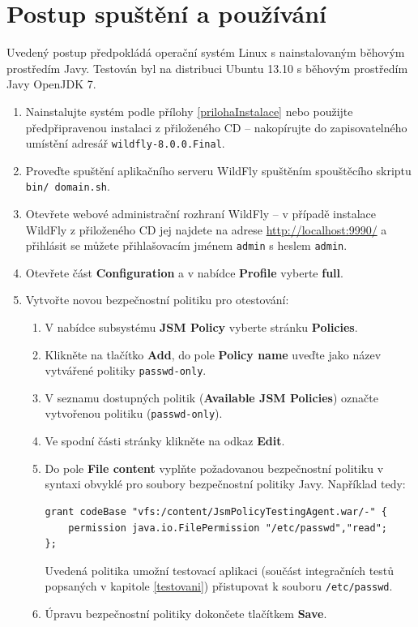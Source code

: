 \chapter{Postup spuštění a používání}\label{prilohaPouzivani}

Uvedený postup předpokládá operační systém Linux s nainstalovaným běhovým prostředím Javy. Testován byl na distribuci Ubuntu 13.10 s běhovým prostředím Javy OpenJDK 7.

\begin{enumerate}
  
  \item Nainstalujte systém podle přílohy \ref{prilohaInstalace} nebo použijte předpřipravenou instalaci z přiloženého CD -- nakopírujte do zapisovatelného umístění adresář {\tt wildfly-8.0.0.Final}.
  \item Proveďte spuštění aplikačního serveru WildFly spuštěním spouštěcího skriptu {\tt bin/ domain.sh}.
  \item Otevřete webové administrační rozhraní WildFly -- v případě instalace WildFly z přiloženého CD jej najdete na adrese \url{http://localhost:9990/} a přihlásit se můžete přihlašovacím jménem {\tt admin} s heslem {\tt admin}.
  \item Otevřete část {\bf Configuration} a v nabídce {\bf Profile} vyberte {\bf full}.
  
  \item Vytvořte novou bezpečnostní politiku pro otestování:
  \begin{enumerate}
    \item V nabídce subsystému {\bf JSM Policy} vyberte stránku {\bf Policies}.
    \item Klikněte na tlačítko {\bf Add}, do pole {\bf Policy name} uveďte jako název vytvářené politiky {\tt passwd-only}.
    \item V seznamu dostupných politik ({\bf Available JSM Policies}) označte vytvořenou politiku ({\tt passwd-only}).
    \item Ve spodní části stránky klikněte na odkaz {\bf Edit}.
    \item Do pole {\bf File content} vyplňte požadovanou bezpečnostní politiku v syntaxi obvyklé pro soubory bezpečnostní politiky Javy. Například tedy:
    \begin{lstlisting}
grant codeBase "vfs:/content/JsmPolicyTestingAgent.war/-" {
    permission java.io.FilePermission "/etc/passwd","read";
};
    \end{lstlisting}
    Uvedená politika umožní testovací aplikaci (součást integračních testů popsaných v kapitole \ref{testovani}) přistupovat k souboru {\tt /etc/passwd}.
    \item Úpravu bezpečnostní politiky dokončete tlačítkem {\bf Save}.
  \end{enumerate}
  

\end{enumerate}
